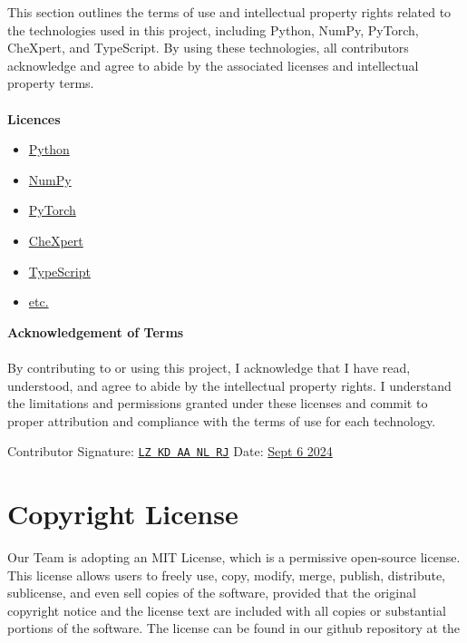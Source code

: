 \documentclass{article}
\begin{document}
This section outlines the terms of use and intellectual property rights related to the technologies used in this project, including Python, NumPy, PyTorch, CheXpert, and TypeScript. By using these technologies, all contributors acknowledge and agree to abide by the associated licenses and intellectual property terms.\\\\
\textbf{Licences}
\begin{itemize}
    \item \href{https://docs.python.org/3/license.html#psf-license}{Python}
    \item \href{https://numpy.org/terms/#:~:text=These%20Terms%20of%20Use%20constitute,mobile%20website%20or%20mobile%20application}{NumPy}
    \item \href{https://discuss.pytorch.org/tos}{PyTorch}
    \item \href{https://www.stanford.edu/site/terms/}{CheXpert}
    \item \href{https://www.typescriptlang.org/License.html}{TypeScript}
    \item \href{https://}{etc.}
\end{itemize}
\textbf{Acknowledgement of Terms}\\\\
By contributing to or using this project, I acknowledge that I have read, understood, and agree to abide by the intellectual property rights. I understand the limitations and permissions granted under these licenses and commit to proper attribution and compliance with the terms of use for each technology.

\vspace{1em} %

\noindent
Contributor Signature: \underline{\texttt{LZ KD AA NL RJ}} \hspace{4cm} Date: \underline{Sept 6 2024}

\section{Copyright License}

Our Team is adopting an MIT License, which is a permissive open-source license. This license  allows users to freely use, copy, modify, merge, publish, distribute, sublicense, and even sell copies of the software, provided that the original copyright notice and the license text are included with all copies or substantial portions of the software. The license can be found in our github repository at the 
\end{document}
